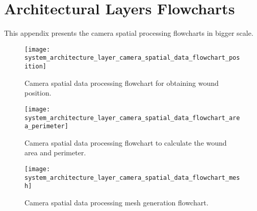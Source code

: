 \chapter{Architectural Layers Flowcharts}
\label{app:architectural_layers_flowcharts}

This appendix presents the camera spatial processing flowcharts in bigger scale.

\begin{figure}[htbp]
	\centering
	\texttt{[image: system\_architecture\_layer\_camera\_spatial\_data\_flowchart\_position]}
	\caption[Camera spatial data processing flowchart for obtaining wound position.]{Camera spatial data processing flowchart for obtaining wound position.}
	\label{fig:system_architecture_layer_camera_spatial_data_flowchart_position}
\end{figure}

\begin{figure}[htbp]
	\centering
	\texttt{[image: system\_architecture\_layer\_camera\_spatial\_data\_flowchart\_area\_perimeter]}
	\caption[Camera spatial data processing flowchart to calculate the wound area and perimeter.]{Camera spatial data processing flowchart to calculate the wound area and perimeter.}
	\label{fig:system_architecture_layer_camera_spatial_data_flowchart_area_perimeter}
\end{figure}

\begin{figure}[htbp]
	\centering
	\texttt{[image: system\_architecture\_layer\_camera\_spatial\_data\_flowchart\_mesh]}
	\caption[Camera spatial data processing mesh generation flowchart.]{Camera spatial data processing mesh generation flowchart.}
	\label{fig:system_architecture_layer_camera_spatial_data_flowchart_mesh}
\end{figure}
